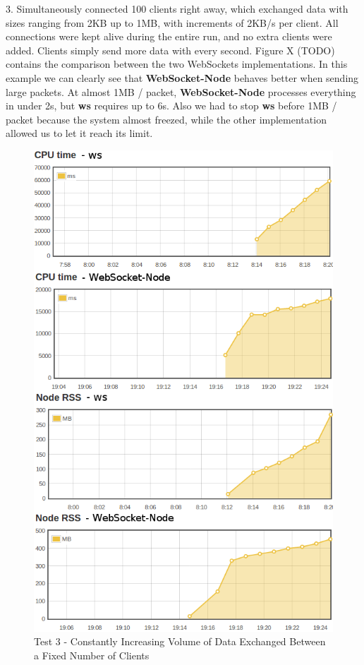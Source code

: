 \documentclass[conference]{IEEEtran}
\begin{document}
3. Simultaneously connected 100 clients right away, which exchanged data with
sizes ranging from 2KB up to 1MB, with increments of 2KB/s per client. All
connections were kept alive during the entire run, and no extra clients were
added. Clients simply send more data with every second. Figure X (TODO)
contains the comparison between the two WebSockets implementations. In this
example we can clearly see that \textbf{WebSocket-Node} behaves better when
sending large packets. At almost 1MB / packet, \textbf{WebSocket-Node}
processes everything in under 2s, but \textbf{ws} requires up to 6s. Also
we had to stop \textbf{ws} before 1MB / packet because the system almost freezed,
while the other implementation allowed us to let it reach its limit.
\\
\begin{frame}{}
  \begin{figure}
    \centering
	\includegraphics[width=1\linewidth]{img/test3v2.png}
    \caption{Test 3 - Constantly Increasing Volume of Data Exchanged Between a
	         Fixed Number of Clients}
  \end{figure}
\end{frame}
\end{document}
